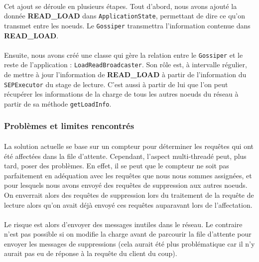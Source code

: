 \documentclass[12pt]{article}
\newcommand{\class}[1]{\texttt{#1}}
\begin{document}
\paragraph{}Cet ajout se déroule en plusieurs étapes. Tout d'abord, nous avons ajouté la donnée \textbf{READ\_LOAD} dans \class{ApplicationState}, permettant de dire ce qu'on transmet entre les noeuds. Le \class{Gossiper} transmettra l'information contenue dans \textbf{READ\_LOAD}.

\paragraph{}Ensuite, nous avons créé une classe qui gère la relation entre le \class{Gossiper} et le reste de l'application : \class{LoadReadBroadcaster}. Son rôle est, à intervalle régulier, de mettre à jour l'information de \textbf{READ\_LOAD} à partir de l'information du \class{SEPExecutor} du stage de lecture. C'est aussi à partir de lui que l'on peut récupérer les informations de la charge de tous les autres noeuds du réseau à partir de sa méthode \texttt{getLoadInfo}.

\subsubsection*{Problèmes et limites rencontrés}

\paragraph{}La solution actuelle se base sur un compteur pour déterminer les requêtes qui ont été affectées dans la file d'attente. Cependant, l'aspect multi-threadé peut, plus tard, poser des problèmes. En effet, il se peut que le compteur ne soit pas parfaitement en adéquation avec les requêtes que nous nous sommes assignées, et pour lesquels nous avons envoyé des requêtes de suppression aux autres noeuds. On enverrait alors des requêtes de suppression lors du traitement de la requête de lecture alors qu'on avait déjà envoyé ces requêtes auparavant lors de l'affectation.

\paragraph{}Le risque est alors d'envoyer des messages inutiles dans le réseau. Le contraire n'est pas possible si on modifie la charge avant de parcourir la file d'attente pour envoyer les messages de suppressions (cela aurait été plus problématique car il n'y aurait pas eu de réponse à la requête du client du coup).
\end{document}
